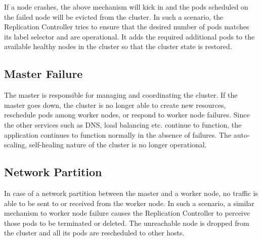 \documentclass[sigconf]{acmart}
\begin{document}
If a node crashes, the above mechanism will kick in and the pods scheduled on the failed node will be evicted from the cluster. In such a scenario, the Replication Controller tries to ensure that the desired number of pods matches its label selector and are operational. It adds the required additional pods to the available healthy nodes in the cluster so that the cluster state is restored.

\subsection{Master Failure}
The master is responsible for managing and coordinating the cluster. If the master goes down, the cluster is no longer able to create new resources, reschedule pods among worker nodes, or respond to worker node failures. Since the other services such as DNS, load balancing etc. continue to function, the application  continues to function normally in the absence of failures. The auto-scaling, self-healing nature of the cluster is no longer operational.

\subsection{Network Partition}
In case of a network partition between the master and a worker node, no traffic is able to be sent to or received from the worker node. In such a scenario, a similar mechanism to worker node failure causes the Replication Controller to perceive those pods to be terminated or deleted. The unreachable node is dropped from the cluster and all its pods are rescheduled to other hosts.
\end{document}
